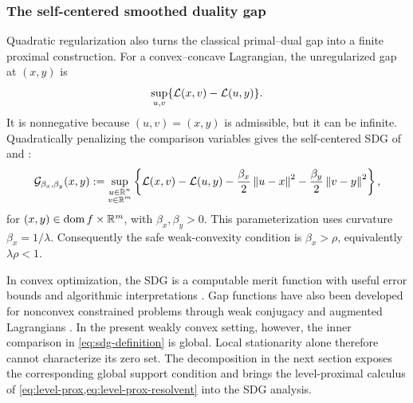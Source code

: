 \subsubsection{The self-centered smoothed duality gap}

Quadratic regularization also turns the classical primal--dual gap into a
finite proximal construction.  For a convex--concave Lagrangian, the
unregularized gap at \((x,y)\) is
\[
  \sup_{u,v}\{\mathcal{L}(x,v)-\mathcal{L}(u,y)\}.
\]
It is nonnegative because \((u,v)=(x,y)\) is admissible, but it can be
infinite.  Quadratically penalizing the comparison variables gives the
self-centered SDG of \citet[Definitions~4--5]{Fercoq2023} and
\citet[Definitions~9--10]{WalwilFercoq2025}:
\begin{equation}
  \mathcal{G}_{\beta_x,\beta_y}(x,y)
  :=
  \sup_{\substack{u\in\mathbb{R}^n\\v\in\mathbb{R}^m}}
  \left\{
    \mathcal{L}(x,v)-\mathcal{L}(u,y)
    -\frac{\beta_x}{2}\left\lVert u-x\right\rVert^2
    -\frac{\beta_y}{2}\left\lVert v-y\right\rVert^2
  \right\},
  \label{eq:sdg-definition}
\end{equation}
for \((x,y)\in\operatorname{dom}f\times\mathbb{R}^m\), with
\(\beta_x,\beta_y>0\).  This parameterization uses curvature
\(\beta_x=1/\lambda\).  Consequently the safe weak-convexity condition is
\(\beta_x>\rho\), equivalently \(\lambda\rho<1\).

In convex optimization, the SDG is a computable merit function with useful
error bounds and algorithmic interpretations \citep{WalwilFercoq2025}.  Gap
functions have also been developed for nonconvex constrained problems through
weak conjugacy and augmented Lagrangians
\citep{YalcinKasimbeyli2020}.  In the present weakly convex setting, however,
the inner comparison in \cref{eq:sdg-definition} is global.  Local
stationarity alone therefore cannot characterize its zero set.  The
decomposition in the next section exposes the corresponding global support
condition and brings the level-proximal calculus of
\cref{eq:level-prox,eq:level-prox-resolvent} into the SDG analysis.

